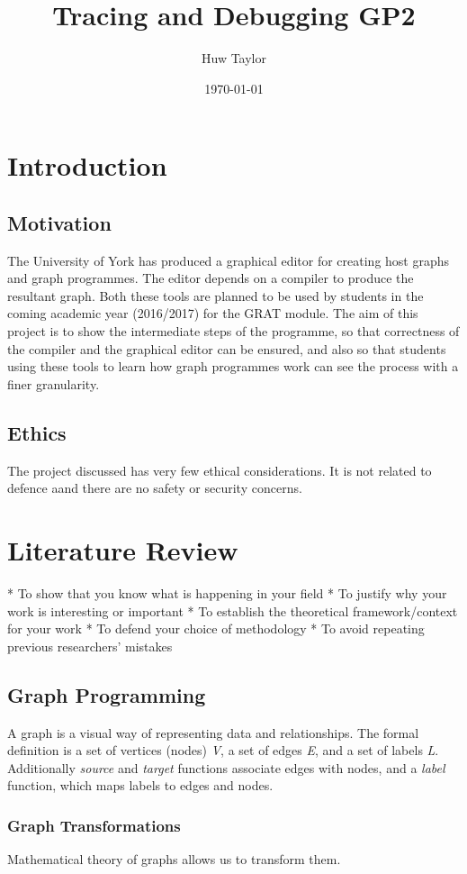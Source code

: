 \documentclass{UoYCSproject}
\author{Huw Taylor}
\title{Tracing and Debugging GP2}
\date{\today}
\begin{document}
\maketitle
\tableofcontents
\listoffigures

\chapter{Introduction}
\section{Motivation}
The University of York has produced a graphical editor for creating host graphs and graph programmes. The editor depends on a compiler to produce the resultant graph. Both these tools are planned to be used by students in the coming academic year (2016/2017) for the GRAT module.
The aim of this project is to show the intermediate steps of the programme, so that correctness of the compiler and the graphical editor can be ensured, and also so that students using these tools to learn how graph programmes work can see the process with a finer granularity.
\section{Ethics}
The project discussed has very few ethical considerations. It is not related to defence aand there are no safety or security concerns.

\chapter{Literature Review}


 * To show that you know what is happening in your field 
 * To justify why your work is interesting or important 
 * To establish the theoretical framework/context for your work 
 * To defend your choice of methodology 
 * To avoid repeating previous researchers’ mistakes
\section{Graph Programming}
A graph is a visual way of representing data and relationships. The formal definition is a set of vertices (nodes) \emph{V}, a set of edges \emph{E}, and a set of labels \emph{L}. Additionally \emph{source} and \emph{target} functions associate edges with nodes, and a \emph{label} function, which maps labels to edges and nodes.

\subsection{Graph Transformations}
Mathematical theory of graphs allows us to transform them.
\end{document}
